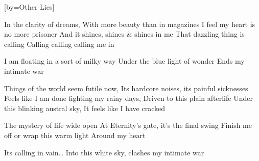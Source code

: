 [by={Other Lies}]

  \chordsoff
  \beginverse
  In the clarity of dreams,
  With more beauty than in magazines 
  I feel my heart is no more prisoner
  And it shines, shines \& shines in me
  That dazzling thing is calling
  Calling calling calling me in  
  \endverse

  \beginchorus
  I am floating in a sort of milky way 
  Under the blue light of wonder
  Ends my intimate war 
  \endchorus

  \beginverse
  Things of the world seem futile now,
  Its hardcore noises, its painful sicknesses
  Feels like I am done fighting my rainy days,
  Driven to this plain afterlife
  Under this blinking austral sky,
  It feels like I have cracked 
  \endverse

  \beginchorus
  The mystery of life wide open 
  At Eternity’s gate, it’s the final swing
  Finish me off or wrap this warm light
  Around my heart 
  \endchorus


  \beginverse
  Its calling in vain…
  Into this white sky, clashes my intimate war 
  \endverse
  
\endsong
